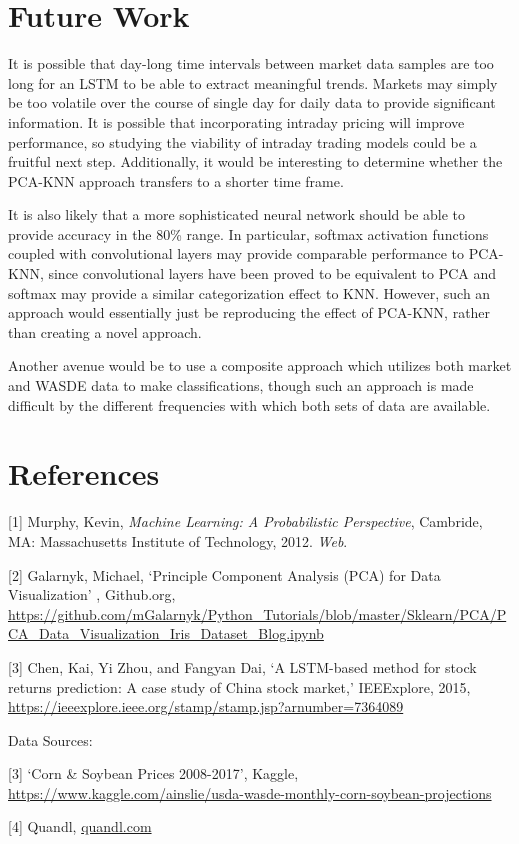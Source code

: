 \documentclass{article}
\begin{document}
\section{Future Work}
It is possible that day-long time intervals between market data samples are too long for an LSTM to be able to extract meaningful trends.  Markets may simply be too volatile over the course of single day for daily data to provide significant information.  It is possible that incorporating intraday pricing will improve performance, so studying the viability of intraday trading models could be a fruitful next step.  Additionally, it would be interesting to determine whether the PCA-KNN approach transfers to a shorter time frame.

It is also likely that a more sophisticated neural network should be able to provide accuracy in the 80\% range.  In particular, softmax activation functions coupled with convolutional layers may provide comparable performance to PCA-KNN, since convolutional layers have been proved to be equivalent to PCA and softmax may provide a similar categorization effect to KNN.  However, such an approach would essentially just be reproducing the effect of PCA-KNN, rather than creating a novel approach.  

Another avenue would be to use a composite approach which utilizes both market and WASDE data to make classifications, though such an approach is made difficult by the different frequencies with which both sets of data are available.

\section*{References}

[1] Murphy, Kevin, \textit{Machine Learning:
A Probabilistic Perspective}, Cambride, MA: Massachusetts Institute of Technology, 2012. \textit{Web}.

[2] Galarnyk, Michael, `Principle Component Analysis (PCA) for Data Visualization'
, Github.org, \url{https://github.com/mGalarnyk/Python_Tutorials/blob/master/Sklearn/PCA/PCA_Data_Visualization_Iris_Dataset_Blog.ipynb}

[3] Chen, Kai, Yi Zhou, and Fangyan Dai, `A LSTM-based method for stock returns prediction: A case study of China stock market,' IEEExplore, 2015, \url{https://ieeexplore.ieee.org/stamp/stamp.jsp?arnumber=7364089}

Data Sources:

[3] `Corn \& Soybean Prices 2008-2017', Kaggle, \url{https://www.kaggle.com/ainslie/usda-wasde-monthly-corn-soybean-projections}

[4] Quandl, \url{quandl.com}
\end{document}
